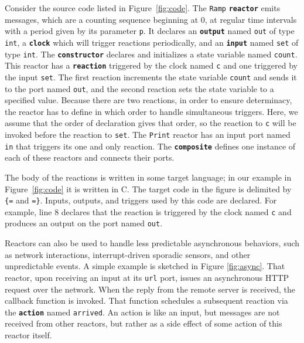 \documentclass[sigconf]{acmart}
\newcommand{\keyword}[1]{\texttt{\textbf{#1}}}
\begin{document}
Consider the source code listed in Figure~\ref{fig:code}. 
The \texttt{Ramp} \keyword{reactor} emits messages, which are a counting sequence beginning at 0, at regular time intervals
with a period given by its parameter \texttt{p}.
It declares an \keyword{output} named \texttt{out} of type \texttt{int}, a
\keyword{clock} which will trigger reactions periodically, and an \keyword{input} named {\tt set} of type {\tt int}.
The \keyword{constructor} declares and initializes a state variable named \texttt{count}.
This reactor has a \keyword{reaction} triggered by the clock named \texttt{c}
and one triggered by the input \texttt{set}.
The first reaction increments the state variable \texttt{count} and sends it to the port named \texttt{out}, and the second reaction
sets the state variable to a specified value.
Because there are two reactions, in order to ensure determinacy, the reactor has to define in which order to
handle simultaneous triggers.
Here, we assume that the order of declaration gives that order, so the reaction to \texttt{c} will be invoked
before the reaction to \texttt{set}.
The \texttt{Print} reactor has an input port named \texttt{in} that triggers its one and only reaction.
The \keyword{composite} defines one instance of each of these reactors and connects their ports.

The body of the reactions is written in some target language; in our example in Figure~\ref{fig:code} it is written in C.
The target code in the figure is delimited by {\tt \{=} and {\tt =\}}.
Inputs, outputs, and triggers used by this code are declared.
For example, line 8 declares that the reaction is triggered by the clock named \texttt{c} and
produces an output on the port named \texttt{out}.

Reactors can also be used to handle less predictable asynchronous behaviors,
such as network interactions, interrupt-driven sporadic sensors, and other unpredictable events.
A simple example is sketched in Figure \ref{fig:async}.
That reactor, upon receiving an input at its \texttt{url} port,
issues an asynchronous HTTP request over the network.
When the reply from the remote server is received, the callback function is invoked.
That function schedules a subsequent reaction via the \keyword{action} named \texttt{arrived}.
An action is like an input, but messages are not received from other reactors,
but rather as a side effect of some action of this reactor itself.
\end{document}
